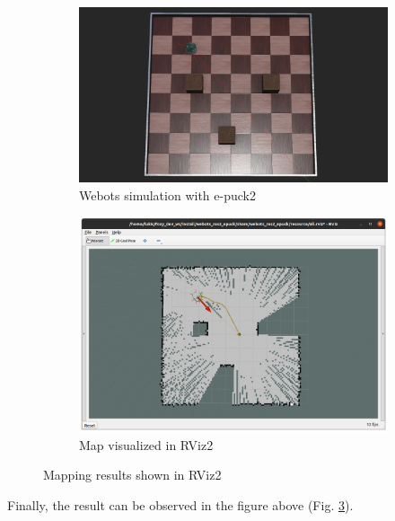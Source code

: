 \begin{figure}[H]
\centering
\begin{subfigure}{.95\textwidth}
  \centering
  \includegraphics[width=\linewidth]{demos/figures/map_webots.png}
  \caption{Webots simulation with e-puck2}
  \label{fig:demos:mapping:map_webots}
\end{subfigure}
\begin{subfigure}{.95\textwidth}
  \centering
  \includegraphics[width=\linewidth]{demos/figures/map_rviz.png}
  \caption{Map visualized in RViz2}
  \label{fig:demos:mapping:map_rviz}
\end{subfigure}
\caption{Mapping results shown in RViz2}
\label{fig:demos:mapping}
\end{figure}

Finally, the result can be observed in the figure above (Fig. \ref{fig:demos:mapping}).

